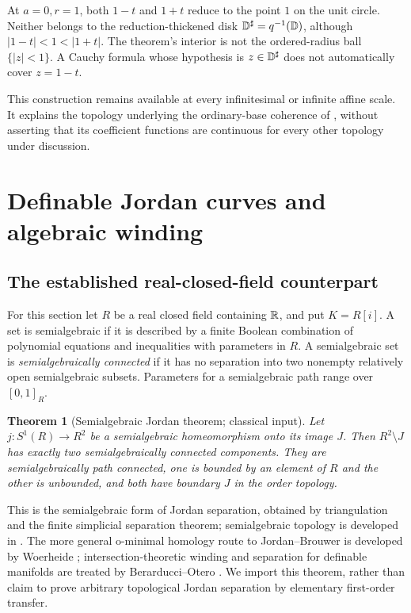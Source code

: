 \documentclass[11pt,letterpaper]{article}
\newtheorem{theorem}{Theorem}[section]
\theoremstyle{definition}
\theoremstyle{remark}
\newcommand{\DD}{\mathbb D}\newcommand{\No}{\mathbf{No}}\newcommand{\SC}{\mathbf{SC}}
\numberwithin{equation}{section}
\begin{document}
\begin{example}
At $a=0,r=1$, both $1-t$ and $1+t$ reduce to the point $1$ on the unit circle. Neither belongs to the reduction-thickened disk $\DD\sh=q^{-1}(\DD)$, although $|1-t|<1<|1+t|$. The theorem's interior is not the ordered-radius ball $\{|z|<1\}$. A Cauchy formula whose hypothesis is $z\in\DD\sh$ does not automatically cover $z=1-t$.
\end{example}

This construction remains available at every infinitesimal or infinite affine scale. It explains the topology underlying the ordinary-base coherence of \cite{Analysis}, without asserting that its coefficient functions are continuous for every other topology under discussion.

\section{Definable Jordan curves and algebraic winding}\label{sec:definable}
\subsection{The established real-closed-field counterpart}
For this section let $R$ be a real closed field containing $\mathbb R$, and put $K=R[i]$. A set is semialgebraic if it is described by a finite Boolean combination of polynomial equations and inequalities with parameters in $R$. A semialgebraic set is \emph{semialgebraically connected} if it has no separation into two nonempty relatively open semialgebraic subsets. Parameters for a semialgebraic path range over $[0,1]_R$.

\begin{theorem}[Semialgebraic Jordan theorem; classical input]\label{thm:def-jordan}
Let $j:S^1(R)\to R^2$ be a semialgebraic homeomorphism onto its image $J$. Then $R^2\setminus J$ has exactly two semialgebraically connected components. They are semialgebraically path connected, one is bounded by an element of $R$ and the other is unbounded, and both have boundary $J$ in the order topology.
\end{theorem}
This is the semialgebraic form of Jordan separation, obtained by triangulation and the finite simplicial separation theorem; semialgebraic topology is developed in \cite{BCR}. The more general o-minimal homology route to Jordan--Brouwer is developed by Woerheide \cite{Woerheide}; intersection-theoretic winding and separation for definable manifolds are treated by Berarducci--Otero \cite{BO}. We import this theorem, rather than claim to prove arbitrary topological Jordan separation by elementary first-order transfer.
\end{document}
